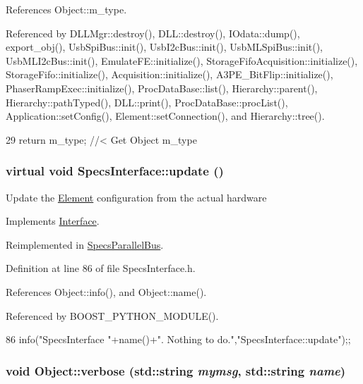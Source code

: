 References Object::m\_\-type.

Referenced by DLLMgr::destroy(), DLL::destroy(), IOdata::dump(), export\_\-obj(), UsbSpiBus::init(), UsbI2cBus::init(), UsbMLSpiBus::init(), UsbMLI2cBus::init(), EmulateFE::initialize(), StorageFifoAcquisition::initialize(), StorageFifo::initialize(), Acquisition::initialize(), A3PE\_\-BitFlip::initialize(), PhaserRampExec::initialize(), ProcDataBase::list(), Hierarchy::parent(), Hierarchy::pathTyped(), DLL::print(), ProcDataBase::procList(), Application::setConfig(), Element::setConnection(), and Hierarchy::tree().


\begin{DoxyCode}
29 { return m_type;       } //< Get Object m_type
\end{DoxyCode}
\hypertarget{classSpecsInterface_af17ca5c8d48bea81f84e503b2994f5da}{
\subsubsection[{update}]{\setlength{\rightskip}{0pt plus 5cm}virtual void SpecsInterface::update ()}}
\label{classSpecsInterface_af17ca5c8d48bea81f84e503b2994f5da}
Update the \hyperlink{classElement}{Element} configuration from the actual hardware 

Implements \hyperlink{classInterface_a30e71ffbe36091df9f7c0838dd4b60d2}{Interface}.

Reimplemented in \hyperlink{classSpecsParallelBus_ab07e067b62824162d7dc86bfbf4ef096}{SpecsParallelBus}.

Definition at line 86 of file SpecsInterface.h.

References Object::info(), and Object::name().

Referenced by BOOST\_\-PYTHON\_\-MODULE().


\begin{DoxyCode}
86 {info("SpecsInterface "+name()+". Nothing to do.","SpecsInterface::update");};
\end{DoxyCode}
\hypertarget{classObject_a2d4120195317e2a3c6532e8bb9f3da68}{
\subsubsection[{verbose}]{\setlength{\rightskip}{0pt plus 5cm}void Object::verbose (std::string {\em mymsg}, \/  std::string {\em name})}}
\label{classObject_a2d4120195317e2a3c6532e8bb9f3da68}



